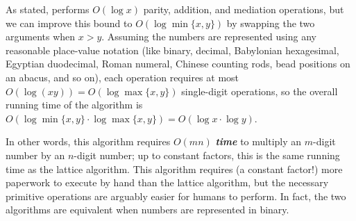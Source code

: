 As stated,  performs $O(\log x)$ parity, addition, and mediation operations, but we can improve this bound to $O(\log\min\{x,y\})$ by swapping the two arguments when $x > y$. Assuming the numbers are represented using any reasonable place-value notation (like binary, decimal, Babylonian hexagesimal, Egyptian duodecimal, Roman numeral, Chinese counting rods, bead positions on an abacus, and so on), each operation requires at most $O(\log(x y)) = O(\log\max\{x,y\})$ single-digit operations, so the overall running time of the algorithm is $O(\log\min\{x,y\} \cdot \log\max\{x,y\}) = O(\log x \cdot \log y)$.

In other words, this algorithm requires $O(mn)$ \textbf{\textit{time}} to multiply an $m$-digit number by an $n$-digit number; up to constant factors, this is the same running time as the lattice algorithm. This algorithm requires (a constant factor!) more paperwork to execute by hand than the lattice algorithm, but the necessary primitive operations are arguably easier for humans to perform. In fact, the two algorithms are equivalent when numbers are represented in binary.

